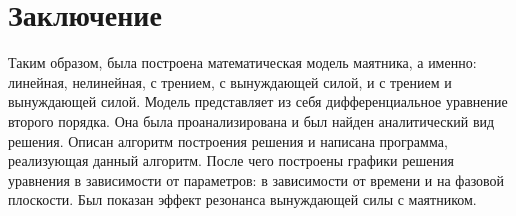 \section{Заключение}
    Таким образом, была построена математическая модель маятника, а именно: линейная, нелинейная, с трением, с вынуждающей силой, и с трением и вынуждающей силой. Модель представляет из себя дифференциальное уравнение второго порядка. Она была проанализирована и был найден аналитический вид решения. Описан алгоритм построения решения и написана программа, реализующая данный алгоритм. После чего построены графики решения уравнения в зависимости от параметров: в зависимости от времени и на фазовой плоскости. Был показан эффект резонанса вынуждающей силы с маятником.
